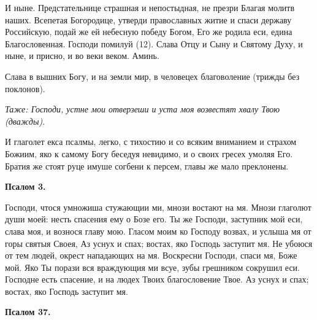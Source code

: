И ныне. Предстательнице страшная и непостыдная, не презри Благая молитв наших. Всепетая Богородице, утверди православных житие и спаси державу Российскую, подай же ей небесную победу Богом, Его же родила еси, едина Благословенная. Господи помилуй (12). Слава Отцу и Сыну и Святому Духу, и ныне, и присно, и во веки веком. Аминь.

Слава в вышних Богу, и на земли мир, в человецех благоволение (трижды без поклонов).


\itshape Таже:\normalfont{} Господи, устне мои отверзеши и уста моя возвестят хвалу Твою (дважды). 

И глаголет екса псалмы, легко, с тихостию и со всяким вниманием и страхом Божиим, яко к самому Богу беседуя невидимо, и о своих гресех умоляя Его. Братия же стоят руце имуше согбени к персем, главы же мало преклонены.


\medskip


\bfseries Псалом 3.\normalfont{}


Господи, чтося умножиша стужающии ми, мнози востают на мя. Мнози глаголют души моей: несть спасения ему о Бозе его. Ты же Господи, заступник мой еси, слава моя, и вознося главу мою. Гласом моим ко Господу возвах, и услыша мя от горы святыя Своея, Аз уснух и спах; востах, яко Господь заступит мя. Не убоюся от тем людей, окрест нападающих на мя. Воскресни Господи, спаси мя, Боже мой. Яко Ты порази вся враждующия ми всуе, зубы грешником сокрушил еси. Господне есть спасение, и на людех Твоих благословение Твое. Аз уснух и спах; востах, яко Господь заступит мя.


\medskip


\bfseries Псалом 37.\normalfont{}


